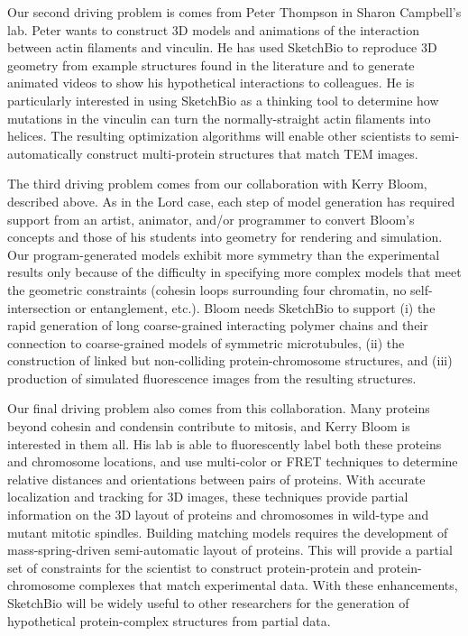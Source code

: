 \documentclass[twocolumn]{bmcart}%
\begin{document}
Our second driving problem is comes from Peter Thompson in Sharon Campbell's lab.  Peter wants to construct 3D models and animations of the interaction between actin filaments and vinculin.  He has used SketchBio to reproduce 3D geometry from example structures found in the literature and to generate animated videos to show his hypothetical interactions to colleagues.  He is particularly interested in using SketchBio as a thinking tool to determine how mutations in the vinculin can turn the normally-straight actin filaments into helices.  The resulting optimization algorithms will enable other scientists to semi-automatically construct multi-protein structures that match TEM images.

The third driving problem comes from our collaboration with Kerry Bloom, described above.  As in the Lord case, each step of model generation has required support from an artist, animator, and/or programmer to convert Bloom's concepts and those of his students into geometry for rendering and simulation.  Our program-generated models exhibit more symmetry than the experimental results only because of the difficulty in specifying more complex models that meet the geometric constraints (cohesin loops surrounding four chromatin, no self-intersection or entanglement, etc.).  Bloom needs SketchBio to support (i) the rapid generation of long coarse-grained interacting polymer chains and their connection to coarse-grained models of symmetric microtubules, (ii) the construction of linked but non-colliding protein-chromosome structures, and (iii) production of simulated fluorescence images from the resulting structures.

Our final driving problem also comes from this collaboration.  Many proteins beyond cohesin and condensin contribute to mitosis, and Kerry Bloom is interested in them all.  His lab is able to fluorescently label both these proteins and chromosome locations, and use multi-color or FRET techniques to determine relative distances and orientations between pairs of proteins.  With accurate localization and tracking for 3D images, these techniques provide partial information on the 3D layout of proteins and chromosomes in wild-type and mutant mitotic spindles.  Building matching models requires the development of mass-spring-driven semi-automatic layout of proteins.  This will provide a partial set of constraints for the scientist to construct protein-protein and protein-chromosome complexes that match experimental data.  With these enhancements, SketchBio will be widely useful to other researchers for the generation of hypothetical protein-complex structures from partial data.
\end{document}
